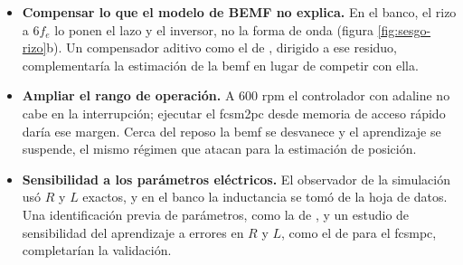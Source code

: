 \documentclass[../../../Tesis_JALS_Maestria.tex]{subfiles}
\begin{document}
\begin{itemize}
    \item \textbf{Compensar lo que el modelo de BEMF no explica.} En el banco, el rizo a $6f_e$ lo ponen el lazo y el inversor, no la forma de onda (figura \ref{fig:sesgo-rizo}b). Un compensador aditivo como el de \citet{zhao2025adaline}, dirigido a ese residuo, complementaría la estimación de la \acrshort{bemf} en lugar de competir con ella.

    \item \textbf{Ampliar el rango de operación.} A $600$ rpm el controlador con \acrshort{adaline} no cabe en la interrupción; ejecutar el \acrshort{fcsm2pc} desde memoria de acceso rápido daría ese margen. Cerca del reposo la \acrshort{bemf} se desvanece y el aprendizaje se suspende, el mismo régimen que atacan \citet{li2019highstability} para la estimación de posición.

    \item \textbf{Sensibilidad a los parámetros eléctricos.} El observador de la simulación usó $R$ y $L$ exactos, y en el banco la inductancia se tomó de la hoja de datos. Una identificación previa de parámetros, como la de \citet{jimenez2021bldc}, y un estudio de sensibilidad del aprendizaje a errores en $R$ y $L$, como el de \citet{young2016mismatch} para el \acrshort{fcsmpc}, completarían la validación.
\end{itemize}
\end{document}
